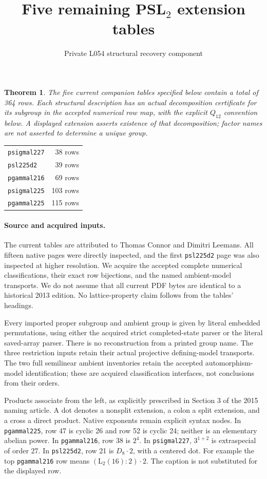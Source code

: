 \documentclass[11pt]{article}
\title{Five remaining PSL$_2$ extension tables}
\author{Private L054 structural recovery component}\date{}
\newtheorem{theorem}{Theorem}\newtheorem{lemma}{Lemma}
\begin{document}
\maketitle
\begin{theorem}
The five current companion tables specified below contain a total of
364 rows. Each structural description has
an actual decomposition certificate for its subgroup in the accepted
numerical row map, with the explicit $Q_{12}$ convention below.
A displayed extension asserts existence of that decomposition; factor
names are not asserted to determine a unique group.
\end{theorem}
\begin{center}\begin{tabular}{lr}
\texttt{psigmal227} & 38 rows\\
\texttt{psl225d2} & 39 rows\\
\texttt{pgammal216} & 69 rows\\
\texttt{psigmal225} & 103 rows\\
\texttt{pgammal225} & 115 rows
\end{tabular}\end{center}

\paragraph{Source and acquired inputs.}
The current tables are attributed to Thomas Connor and Dimitri Leemans.
All fifteen native pages were directly inspected, and the first
\texttt{psl225d2} page was also inspected at higher resolution.
We acquire the accepted complete numerical classifications, their exact
row bijections, and the named ambient-model transports. We do not assume
that all current PDF bytes are identical to a historical 2013 edition.
No lattice-property claim follows from the tables' headings.

Every imported proper subgroup and ambient group is given by literal
embedded permutations, using either the acquired strict completed-state
parser or the literal saved-array parser. There is no reconstruction from
a printed group name. The three restriction inputs retain their actual
projective defining-model transports. The two full semilinear ambient
inventories retain the accepted automorphism-model identification; these
are acquired classification interfaces, not conclusions from their orders.

Products associate from the left, as explicitly prescribed in Section 3
of the 2015 naming article. A dot denotes a nonsplit extension, a colon a
split extension, and a cross a direct product. Native exponents remain
explicit syntax nodes. In \texttt{pgammal225}, row 47 is cyclic 26 and
row 52 is cyclic 24; neither is an elementary abelian power. In
\texttt{pgammal216}, row 38 is $2^4$. In \texttt{psigmal227},
$3^{1+2}$ is extraspecial of order 27. In \texttt{psl225d2}, row 21 is
$D_8\mathbin{\cdot}2$, with a centered dot. For example the top
\texttt{pgammal216} row means $(\mathrm L_2(16):2)\mathbin{\cdot}2$.
The caption is not substituted for the displayed row.
\end{document}
